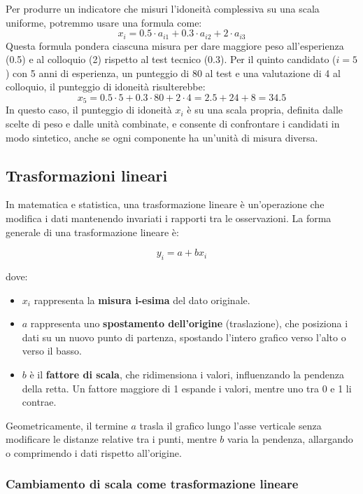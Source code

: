 \documentclass[
  11pt,
]{book}
\providecommand{\tightlist}{%
  \setlength{\itemsep}{0pt}\setlength{\parskip}{0pt}}
\theoremstyle{mytheoremstyle}
\theoremstyle{mydefstyle}
\begin{document}
Per produrre un indicatore che misuri l'idoneità complessiva su una scala uniforme, potremmo usare una formula come:
\[
      x_i = 0.5 \cdot a_{i1} + 0.3 \cdot a_{i2} + 2 \cdot a_{i3}
      \]
Questa formula pondera ciascuna misura per dare maggiore peso all'esperienza (0.5) e al colloquio (2) rispetto al test tecnico (0.3). Per il quinto candidato (\(i=5\)) con 5 anni di esperienza, un punteggio di 80 al test e una valutazione di 4 al colloquio, il punteggio di idoneità risulterebbe:
\[
      x_5 = 0.5 \cdot 5 + 0.3 \cdot 80 + 2 \cdot 4 = 2.5 + 24 + 8 = 34.5
      \]
In questo caso, il punteggio di idoneità \(x_i\) è su una scala propria, definita dalle scelte di peso e dalle unità combinate, e consente di confrontare i candidati in modo sintetico, anche se ogni componente ha un'unità di misura diversa.

\subsection{Trasformazioni lineari}\label{trasformazioni-lineari}

In matematica e statistica, una trasformazione lineare è un'operazione che modifica i dati mantenendo invariati i rapporti tra le osservazioni. La forma generale di una trasformazione lineare è:

\[
y_i = a + b x_i
\]

dove:

\begin{itemize}
\tightlist
\item
  \(x_i\) rappresenta la \textbf{misura i-esima} del dato originale.
\item
  \(a\) rappresenta uno \textbf{spostamento dell'origine} (traslazione), che posiziona i dati su un nuovo punto di partenza, spostando l'intero grafico verso l'alto o verso il basso.
\item
  \(b\) è il \textbf{fattore di scala}, che ridimensiona i valori, influenzando la pendenza della retta. Un fattore maggiore di 1 espande i valori, mentre uno tra 0 e 1 li contrae.
\end{itemize}

Geometricamente, il termine \(a\) trasla il grafico lungo l'asse verticale senza modificare le distanze relative tra i punti, mentre \(b\) varia la pendenza, allargando o comprimendo i dati rispetto all'origine.

\subsubsection{Cambiamento di scala come trasformazione lineare}\label{cambiamento-di-scala-come-trasformazione-lineare}
\end{document}
